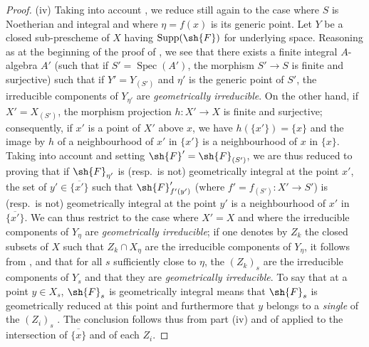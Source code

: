 \begin{proof}
(iv) Taking into account , we reduce still again to the case where $S$ is Noetherian and integral and where $\eta=f(x)$ is its generic point.
Let $Y$ be a closed sub-prescheme of $X$ having $\operatorname{Supp}(\sh{F})$ for underlying space.
Reasoning as at the beginning of the proof of , we see that there exists a finite integral $A$-algebra $A'$ (such that if $S'=\operatorname{Spec}(A')$, the morphism $S'\to S$ is finite and surjective) such that if $Y'=Y_{(S')}$ and $\eta'$ is the generic point of $S'$, the irreducible components of $Y_{\eta'}$ are \emph{geometrically irreducible}.
On the other hand, if $X'=X_{(S')}$, the morphism projection $h:X'\to X$ is finite and surjective; consequently, if $x'$ is a point of $X'$ above $x$, we have $h(\{x'\})=\{x\}$ and the image by $h$ of a neighbourhood of $x'$ in $\{x'\}$ is a neighbourhood of $x$ in $\{x\}$.
Taking into account  and setting $\sh{F}'=\sh{F}_{(S')}$, we are thus reduced to proving that if $\sh{F}_{\eta'}$ is (resp.~is not) geometrically integral at the point $x'$, the set of $y'\in\overline{\{x'\}}$ such that $\sh{F}'_{f'(y')}$ (where $f'=f_{(S')}:X'\to S'$) is (resp.~is not) geometrically integral at the point $y'$ is a neighbourhood of $x'$ in $\overline{\{x'\}}$.
We can thus restrict to the case where $X'=X$ and where the irreducible components of $Y_\eta$ are \emph{geometrically irreducible}; if one denotes by $Z_k$ the closed subsets of $X$ such that $Z_k\cap X_\eta$ are the
irreducible components of $Y_\eta$, it follows from ,  and  that for all $s$ sufficiently close to $\eta$, the $(Z_k)_s$ are the irreducible components of $Y_s$ and that they are \emph{geometrically irreducible}.
To say that at a point $y\in X_s$, $\sh{F}_s$ is geometrically integral means that $\sh{F}_s$ is geometrically reduced at this point and furthermore that $y$ belongs to a \emph{single} of the $(Z_i)_s$ .
The conclusion follows thus from part (iv) and of  applied to the intersection of $\overline{\{x\}}$ and of each $Z_i$.


\end{proof}
